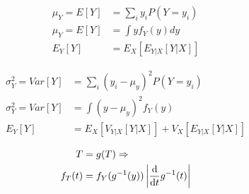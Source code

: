 \documentclass[9pt,a4paper]{extarticle}
\begin{document}
\pagestyle{empty}

%

\thispagestyle{empty}


\begin{minipage}[c]{0.30\textwidth}
\begin{align*}
  \mu_Y = E[Y] &= \sum_i y_i P(Y=y_i)\\
  \mu_Y = E[Y] &= \int y f_Y(y) dy \\
  E_Y[Y] &= E_{X}[E_{Y|X}[Y|X]] 
\end{align*}
\end{minipage}%
\begin{minipage}[c]{0.45\textwidth}
\begin{align*}
  \sigma^2_Y = Var[Y] &= \sum_i (y_i-\mu_y)^2 P(Y=y_i) \\
  \sigma^2_Y = Var[Y] &= \int (y-\mu_y)^2  f_Y(y) \\
  E_Y[Y] &= E_{X}[V_{Y|X}[Y|X]] + V_{X}[E_{Y|X}[Y|X]]
\end{align*}
\end{minipage}%
\begin{minipage}[c]{0.25\textwidth}
\begin{align*}
  T &= g(T) \Rightarrow \\
  f_T(t) &= f_Y(g^{-1}(y)) \left| \frac{{\rm d}}{{\rm d}t}g^{-1}(t)\right| 
\end{align*}
\end{minipage}


\vspace{0.3cm}
\end{document}
